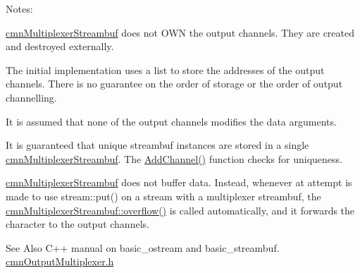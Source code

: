 Notes\-:
\begin{DoxyEnumerate}
\item \hyperlink{classcmn_multiplexer_streambuf}{cmn\-Multiplexer\-Streambuf} does not O\-W\-N the output channels. They are created and destroyed externally.
\item The initial implementation uses a list to store the addresses of the output channels. There is no guarantee on the order of storage or the order of output channelling.
\item It is assumed that none of the output channels modifies the data arguments.
\item It is guaranteed that unique streambuf instances are stored in a single \hyperlink{classcmn_multiplexer_streambuf}{cmn\-Multiplexer\-Streambuf}. The \hyperlink{classcmn_multiplexer_streambuf_a1e33a4858eb94ed085987ddbcc01a1d0}{Add\-Channel()} function checks for uniqueness.
\item \hyperlink{classcmn_multiplexer_streambuf}{cmn\-Multiplexer\-Streambuf} does not buffer data. Instead, whenever at attempt is made to use stream\-::put() on a stream with a multiplexer streambuf, the \hyperlink{classcmn_multiplexer_streambuf_a90999d31356176b52174452e2a43c1ae}{cmn\-Multiplexer\-Streambuf\-::overflow()} is called automatically, and it forwards the character to the output channels.

\begin{DoxySeeAlso}{See Also}
C++ manual on basic\-\_\-ostream and basic\-\_\-streambuf. \hyperlink{cmn_output_multiplexer_8h}{cmn\-Output\-Multiplexer.\-h} 
\end{DoxySeeAlso}

\end{DoxyEnumerate}

